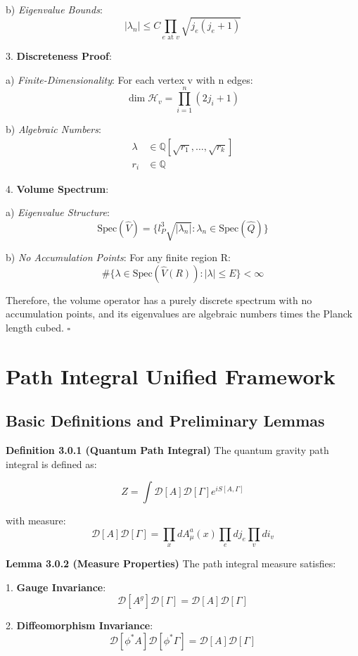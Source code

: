\documentclass[12pt,a4paper]{article}
\begin{document}
   b) \textit{Eigenvalue Bounds}:
      \[
      |\lambda_n| \leq C\prod_{e \text{ at } v}\sqrt{j_e(j_e+1)}
      \]

3. \textbf{Discreteness Proof}:
   
   a) \textit{Finite-Dimensionality}:
      For each vertex v with n edges:
      \[
      \dim\mathcal{H}_v = \prod_{i=1}^n(2j_i+1)
      \]
   
   b) \textit{Algebraic Numbers}:
      \[
      \begin{aligned}
      \lambda &\in \mathbb{Q}[\sqrt{r_1},\ldots,\sqrt{r_k}] \\
      r_i &\in \mathbb{Q}
      \end{aligned}
      \]

4. \textbf{Volume Spectrum}:
   
   a) \textit{Eigenvalue Structure}:
      \[
      \text{Spec}(\hat{V}) = \{l_P^3\sqrt{|\lambda_n|}: \lambda_n \in \text{Spec}(\hat{Q})\}
      \]
   
   b) \textit{No Accumulation Points}:
      For any finite region R:
      \[
      \#\{\lambda \in \text{Spec}(\hat{V}(R)): |\lambda| \leq E\} < \infty
      \]

Therefore, the volume operator has a purely discrete spectrum with no accumulation points, and its eigenvalues are algebraic numbers times the Planck length cubed. $\square$

\section{Path Integral Unified Framework}
\subsection{Basic Definitions and Preliminary Lemmas}

\textbf{Definition 3.0.1 (Quantum Path Integral)}
The quantum gravity path integral is defined as:


\[
Z = \int \mathcal{D}[A]\mathcal{D}[\Gamma] e^{iS[A,\Gamma]}
\]

with measure:
\[
\mathcal{D}[A]\mathcal{D}[\Gamma] = \prod_x dA_\mu^a(x) \prod_e dj_e \prod_v di_v
\]

\textbf{Lemma 3.0.2 (Measure Properties)}
The path integral measure satisfies:

1. \textbf{Gauge Invariance}:
   \[
   \mathcal{D}[A^g]\mathcal{D}[\Gamma] = \mathcal{D}[A]\mathcal{D}[\Gamma]
   \]

2. \textbf{Diffeomorphism Invariance}:
   \[
   \mathcal{D}[\phi^*A]\mathcal{D}[\phi^*\Gamma] = \mathcal{D}[A]\mathcal{D}[\Gamma]
   \]
\end{document}

